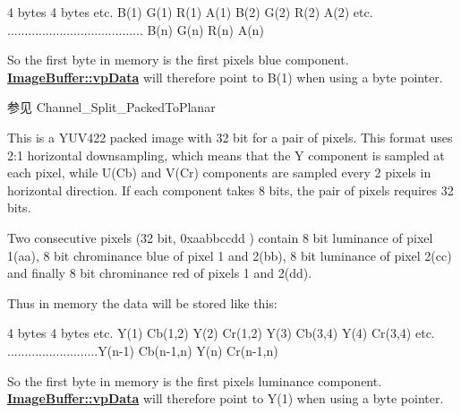 \begin{Desc}
\begin{description}
\begin{DoxyCode}
4 bytes             4 bytes             etc.
B(1) G(1) R(1) A(1) B(2) G(2) R(2) A(2) etc.
.......................................
                    B(n) G(n) R(n) A(n)
\end{DoxyCode}


So the first byte in memory is the first pixels blue component. {\bfseries \hyperlink{struct_image_buffer_ab67c9c21d749e786302c848b508e0673}{Image\+Buffer\+::vp\+Data}} will therefore point to B(1) when using a byte pointer.

\begin{DoxySeeAlso}{参见}
Channel\+\_\+\+Split\+\_\+\+Packed\+To\+Planar 
\end{DoxySeeAlso}
\item[{\em 
\hypertarget{group___common_interface_gga02e0fc32ff10e0bc0f2e8b9c321d65c9a6527d8851b249d308c41ba8df79681cf}{idpf\+Y\+U\+V422\+Packed}\label{group___common_interface_gga02e0fc32ff10e0bc0f2e8b9c321d65c9a6527d8851b249d308c41ba8df79681cf}
}]This is a Y\+U\+V422 packed image with 32 bit for a pair of pixels. This format uses 2\+:1 horizontal downsampling, which means that the Y component is sampled at each pixel, while U(\+Cb) and V(\+Cr) components are sampled every 2 pixels in horizontal direction. If each component takes 8 bits, the pair of pixels requires 32 bits.

Two consecutive pixels (32 bit, 0xaabbccdd ) contain 8 bit luminance of pixel 1(aa), 8 bit chrominance blue of pixel 1 and 2(bb), 8 bit luminance of pixel 2(cc) and finally 8 bit chrominance red of pixels 1 and 2(dd).

Thus in memory the data will be stored like this\+:


\begin{DoxyCode}
4 bytes                   4 bytes                         etc.
Y(1) Cb(1,2) Y(2) Cr(1,2) Y(3)   Cb(3,4)   Y(4) Cr(3,4)   etc.
..........................Y(n-1) Cb(n-1,n) Y(n) Cr(n-1,n)
\end{DoxyCode}


So the first byte in memory is the first pixels luminance component. {\bfseries \hyperlink{struct_image_buffer_ab67c9c21d749e786302c848b508e0673}{Image\+Buffer\+::vp\+Data}} will therefore point to Y(1) when using a byte pointer.


\end{description}
\end{Desc}
